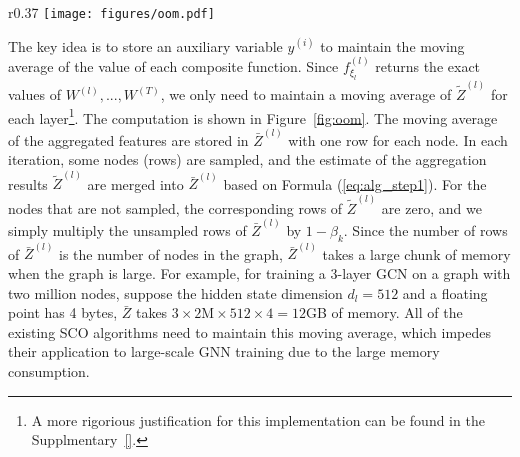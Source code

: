 \begin{wrapfigure}{r}{0.37\textwidth}
  \centering
  \vspace{-0.5em}
  \texttt{[image: figures/oom.pdf]}
  \vspace{-.5em}
  \caption{Updating the moving average of $\widetilde{Z}^{(l)}$ in each iteration. }
  \label{fig:oom}
  \vspace{-1.5em}
\end{wrapfigure}
The key idea is to store an auxiliary variable $y^{(i)}$ to maintain the moving average of the value of each composite function. 
Since $f^{(l)}_{\xi_l}$ returns the exact values of $W^{(l)}, ..., W^{(T)}$, we only need to maintain a moving average of $\widetilde{Z}^{(l)}$ for each layer\footnote{A more rigorious justification for this implementation can be found in the Supplmentary~\ref{}.}. 
The computation is shown in Figure~\ref{fig:oom}. 
The moving average of the aggregated features are stored in $\bar{Z}^{(l)}$ with one row for each node. 
In each iteration, some nodes (rows) are sampled, and the estimate of the aggregation results $\widetilde{Z}^{(l)}$ are merged into $\bar{Z}^{(l)}$ based on Formula (\ref{eq:alg_step1}). 
For the nodes that are not sampled, the corresponding rows of $\widetilde{Z}^{(l)}$ are zero, and we simply multiply the unsampled rows of  $\bar{Z}^{(l)}$ by $1-\beta_k$. 
Since the number of rows of $\bar{Z}^{(l)}$ is the number of nodes in the graph, $\bar{Z}^{(l)}$ takes a large chunk of memory when the graph is large. 
For example, for training a 3-layer GCN on a graph with two million nodes, suppose the hidden state dimension $d_l=512$ and a floating point has 4 bytes, $\bar{Z}$ takes $3\times 2\text{M} \times 512 \times 4=12$GB of memory. 
All of the existing SCO algorithms need to maintain this moving average, which impedes their application to large-scale GNN training due to the large memory consumption. 








